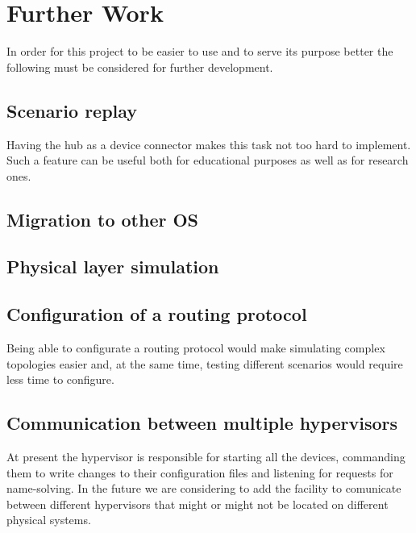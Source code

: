 \chapter{Further Work}
\label{chapter:further}
In order for this project to be easier to use and to serve its purpose better the following must be considered for further development.
\section{Scenario replay}
\label{sec:scenario-replay}
Having the hub as a device connector makes this task not too hard to implement. Such a feature can be useful both for educational purposes as well as for research ones.
\section{Migration to other OS}
\label{sec:migration-os}

\section{Physical layer simulation}
\label{sec:physica-sim}

\section{Configuration of a routing protocol}
\label{sec:routing-prot}
Being able to configurate a routing protocol would make simulating complex topologies easier and, at the same time, testing different scenarios would require less time to configure. 

\section{Communication between multiple hypervisors}
\label{sec:hypervisor-comm}
At present the hypervisor is responsible for starting all the devices, commanding them to write changes to their configuration files and listening for requests for name-solving. In the future we are considering to add the facility to comunicate between different hypervisors that might or might not be located on different physical systems. 
